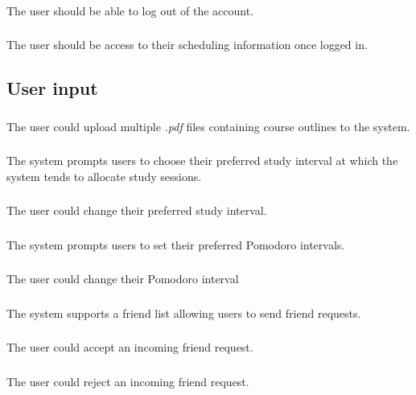 \documentclass[12pt]{article}
\begin{document}
\subsubsection{}
The user should be able to log out of the account.
\subsubsection{}
The user should be access to their scheduling information once logged in.


\subsection{User input}
\subsubsection{}
The user could upload multiple \textit{.pdf} files containing course outlines to the system.
\subsubsection{}
The system prompts users to choose their preferred study interval at which the system tends to allocate study sessions.
\subsubsection{}
The user could change their preferred study interval.
\subsubsection{}
The system prompts users to set their preferred Pomodoro intervals. 
\subsubsection{}
The user could change their Pomodoro interval
\subsubsection{}
The system supports a friend list allowing users to send friend requests.
\subsubsection{}
The user could accept an incoming friend request.
\subsubsection{}
The user could reject an incoming friend request.
\end{document}
